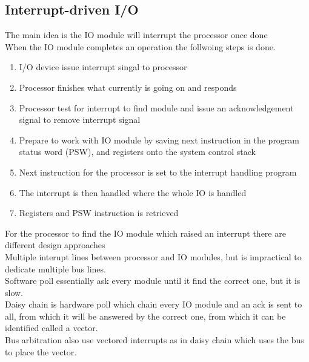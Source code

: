 \documentclass[12pt, a4paper]{article}
\begin{document}
		\subsection{Interrupt-driven I/O}
			The main idea is the IO module will interrupt the processor once done\\
			When the IO module completes an operation the follwoing steps is done.
			\begin{enumerate}
				\item I/O device issue interrupt singal to processor
				\item Processor finishes what currently is going on and responds
				\item Processor test for interrupt to find module and issue an acknowledgement signal to remove interrupt signal
				\item Prepare to work with IO module by saving next instruction in the program status word (PSW), and registers onto the system control stack
				\item Next instruction for the processor is set to the interrupt handling program
				\item The interrupt is then handled where the whole IO is handled
				\item Registers and PSW instruction is retrieved
			\end{enumerate}
			For the processor to find the IO module which raised an interrupt there are different design approaches\\
			Multiple interupt lines between processor and IO modules, but is impractical to dedicate multiple bus lines.\\
			Software poll essentially ask every module until it find the correct one, but it is slow.\\
			Daisy chain is hardware poll which chain every IO module and an ack is sent to all, from which it will be answered by the correct one, from which it can be identified called a vector.\\
			Bus arbitration also use vectored interrupts as in daisy chain which uses the bus to place the vector.\\
\end{document}
